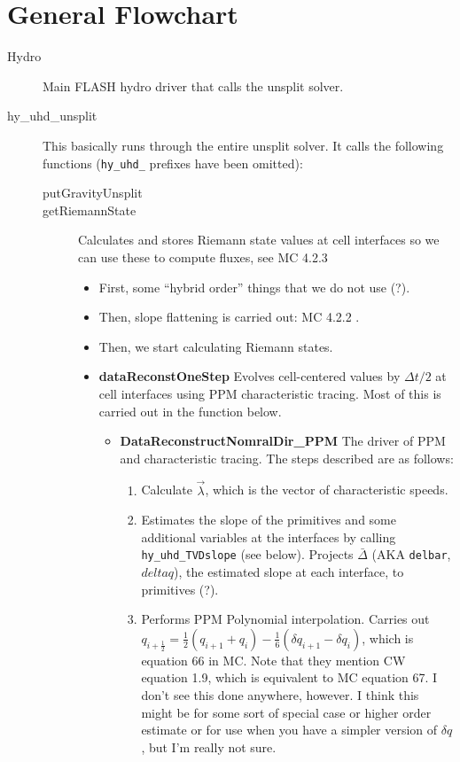\documentclass[preprint,11pt]{aastex}
\begin{document}
\section{General Flowchart}
\label{sec:flowchart}
\begin{description}
	\item[Hydro] Main FLASH hydro driver that calls the unsplit solver.
	\item[hy\_uhd\_unsplit] This basically runs through the entire unsplit solver.  It calls the following functions (\verb!hy_uhd_! prefixes have been omitted):
	\begin{description}
		\item[putGravityUnsplit]
		\item[getRiemannState]  Calculates and stores Riemann state values at cell interfaces so we can use these to compute fluxes, see MC 4.2.3
		\begin{itemize}
			\item First, some "`hybrid order"' things that we do not use (?).
			\item Then, slope flattening is carried out: MC 4.2.2 .
			\item Then, we start calculating Riemann states.
			\item \textbf{dataReconstOneStep} Evolves cell-centered values by $\Delta t / 2$ at cell interfaces using PPM characteristic tracing.  Most of this is carried out in the function below.
			\begin{itemize}
				\item \textbf{DataReconstructNomralDir\_PPM} The driver of PPM and characteristic tracing.  The steps described are as follows:
				\begin{enumerate}
					\item Calculate $\vec{\lambda}$, which is the vector of characteristic speeds.
					\item Estimates the slope of the primitives and some additional variables at the interfaces by calling \verb!hy_uhd_TVDslope! (see below).  Projects $\bar{\Delta}$ (AKA \verb!delbar!, $delta q$), the estimated slope at each interface, to primitives (?).%
					\item Performs PPM Polynomial interpolation.   Carries out $q_{i+\frac{1}{2}} = \frac{1}{2} \left( q_{i+1} + q_i \right) - \frac{1}{6} \left( \delta q_{i+1} - \delta q_i \right)$, which is equation 66 in MC.  Note that they mention CW equation 1.9, which is equivalent to MC equation 67.  I don't see this done anywhere, however.  I think this might be for some sort of special case or higher order estimate or for use when you have a simpler version of $\delta q$, but I'm really not sure.

\end{enumerate}
\end{itemize}
\end{itemize}
\end{description}
\end{description}
\end{document}
